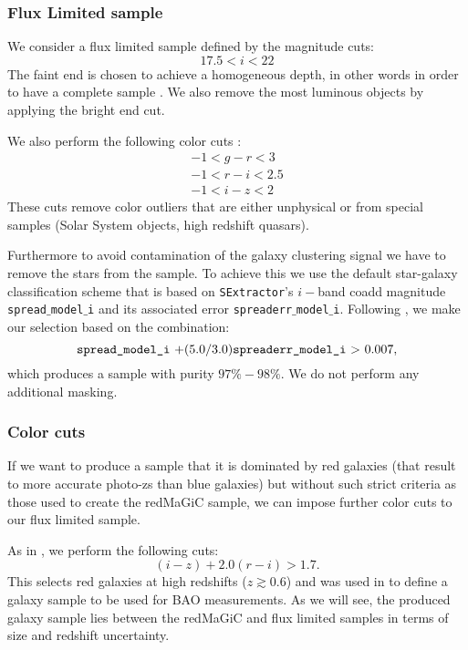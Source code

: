 \documentclass[a4paper,fleqn,usenatbib]{mnras}
\begin{document}
\subsubsection{Flux Limited sample}
\label{subsubsec: Flux_lim}


We consider a flux limited sample defined by the magnitude cuts:
\begin{equation}
17.5 < i <  22
\end{equation}
The faint end is chosen to achieve a homogeneous depth, in other words in order to have a complete sample \citep{Crocce2019}. We also remove the most luminous objects by applying the bright end cut.

We also perform the following color cuts \citep{Crocce2016}:
\begin{eqnarray}
-1  <  g - r  <  3\\
-1  <  r- i  < 2.5\\
- 1 < i - z < 2
\end{eqnarray}
These cuts remove color outliers that are either unphysical or from special samples (Solar System objects, high redshift quasars).

Furthermore to avoid contamination of the galaxy clustering signal we have to remove the stars from the sample. To achieve this we use the default star-galaxy classification scheme that is based on \texttt{SExtractor}'s $i-$band coadd magnitude \texttt{spread{$\_$}model{$\_$}i} and its associated error \texttt{spreaderr{$\_$}model{$\_$}i}. Following \citealt{Crocce2019},  we make our selection based on the combination:
\begin{equation}
\mbox{\texttt{spread{$\_$}model{$\_$}i} +(5.0/3.0)\texttt{spreaderr{$\_$}model{$\_$}i} > 0.007}, 
\end{equation}
which produces a sample with purity $97\% - 98\%$. We do not perform any additional masking. 


\subsubsection{Color cuts}
\label{subsubsec: Color_cuts}

If we want to produce a sample that it is dominated by red galaxies (that result to more accurate photo-zs than blue galaxies) but without such strict criteria as those used to create the redMaGiC sample, we can impose further color cuts to our flux limited sample.

As in \citep{Crocce2019}, we perform the following cuts:
\begin{equation}
(i-z) +2.0(r-i) >1.7.
\end{equation}
This selects red galaxies at high redshifts ($ z \gtrsim 0.6$) and was used in  \citep{Crocce2019} to define a galaxy sample to be used for BAO measurements. As we will see, the produced galaxy sample lies between the redMaGiC and flux limited samples in terms of size and redshift uncertainty.
\end{document}
